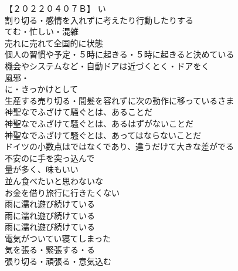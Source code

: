 【２０２２０４０７Ｂ】
い\\
割り切る・感情を入れずに考えたり行動したりする\\
てむ・忙しい・混雑\\
売れに売れて全国的に状態\\

個人の習慣や予定・５時に起きる・５時に起きると決めている\\
機会やシステムなど・自動ドアは近づくとく・ドアをく\\

風邪・\\

に・きっかけとして\\
生産する売り切る・間髪を容れずに次の動作に移っているさま\\

神聖なでふざけて騒ぐとは、あることだ\\
神聖なでふざけて騒ぐとは、あるはずがないことだ\\
神聖なでふざけて騒ぐとは、あってはならないことだ\\

ドイツの小数点はではなくであり、違うだけて大きな差がでる\\

不安のに手を突っ込んで\\

量が多く、味もいい\\
並ん食べたいと思わないな\\
お金を借り旅行に行きたくない\\

雨に濡れ遊び続けている\\
雨に濡れ遊び続けている\\
雨に濡れ遊び続けている\\
電気がついてい寝てしまった\\

気を張る・緊張する・る\\
張り切る・頑張る・意気込む\\

